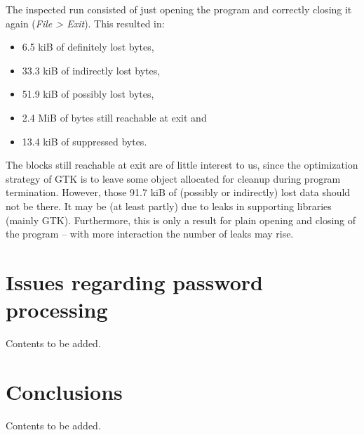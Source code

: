 \documentclass[11pt]{article}
\begin{document}
The inspected run consisted of just opening the program and correctly closing it again (\textit{File > Exit}). This resulted in:
\begin{itemize}[topsep=0pt, itemsep=0pt]
\item 6.5 kiB of definitely lost bytes,
\item 33.3 kiB of indirectly lost bytes,
\item 51.9 kiB of possibly lost bytes,
\item 2.4 MiB of bytes still reachable at exit and
\item 13.4 kiB of suppressed bytes.
\end{itemize}
\noindent
The blocks still reachable at exit are of little interest to us, since the optimization strategy of GTK is to leave some object allocated for cleanup during program termination. However, those 91.7 kiB of (possibly or indirectly) lost data should not be there. It may be (at least partly) due to leaks in supporting libraries (mainly GTK). Furthermore, this is only a result for plain opening and closing of the program -- with more interaction the number of leaks may rise.

\section{Issues regarding password processing}

Contents to be added.

\section{Conclusions}

Contents to be added.
\end{document}
